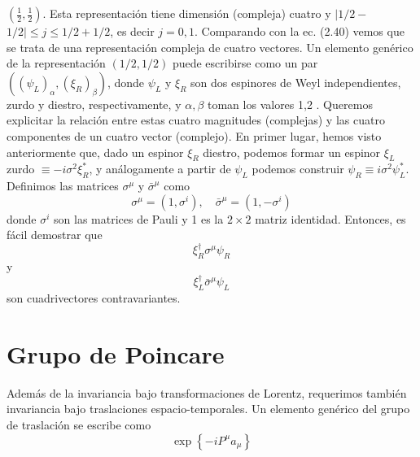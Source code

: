 {                      $\left(\frac{1}{2}, \frac{1}{2}\right)$. Esta representación tiene dimensión (compleja) cuatro y $\mid 1 / 2-$ $1 / 2 \mid \leqslant j \leqslant 1 / 2+1 / 2$, es decir $j=0,1$. Comparando con la ec. (2.40) vemos que se trata de una representación compleja de cuatro vectores. Un elemento genérico de la representación $(1 / 2,1 / 2)$ puede escribirse como un par $\left(\left(\psi_{L}\right)_{\alpha},\left(\xi_{R}\right)_{\beta}\right)$, donde $\psi_{L}$ y $\xi_{R}$ son dos espinores de Weyl independientes, zurdo y diestro, respectivamente, y $\alpha, \beta$ toman los valores 1,2 . Queremos explicitar la relación entre estas cuatro magnitudes (complejas) y las cuatro componentes de un cuatro vector (complejo). En primer lugar, hemos visto anteriormente que, dado un espinor $\xi_{R}$ diestro, podemos formar un espinor $\xi_{L}$ zurdo $\equiv-i \sigma^{2} \xi_{R}^{*}$, y análogamente a partir de $\psi_{L}$ podemos construir $\psi_{R} \equiv i \sigma^{2} \psi_{L}^{*}$. Definimos las matrices $\sigma^{\mu}$ y $\bar{\sigma}^{\mu}$ como
                      \begin{equation*}
                        \sigma^{\mu}=\left(1, \sigma^{i}\right), \quad \bar{\sigma}^{\mu}=\left(1,-\sigma^{i}\right) \tag{2.67}
                        \end{equation*}
                        donde $\sigma^{i}$ son las matrices de Pauli y 1 es la $2 \times 2$ matriz identidad. Entonces, es fácil demostrar que
                        \begin{equation*}
                          \xi_{R}^{\dagger} \sigma^{\mu} \psi_{R} \tag{2.68}
                          \end{equation*}
                          y 
                          \begin{equation*}
                            \xi_{L}^{\dagger} \bar{\sigma}^{\mu} \psi_{L} \tag{2.69}
                            \end{equation*}
                            son cuadrivectores contravariantes.


  \section{Grupo de Poincare}
  Además de la invariancia bajo transformaciones de Lorentz, requerimos también invariancia bajo traslaciones espacio-temporales. Un elemento genérico del grupo de traslación se escribe como
  \begin{equation*}
    \exp \left\{-i P^{\mu} a_{\mu}\right\} \tag{2.96}
    \end{equation*}

}
